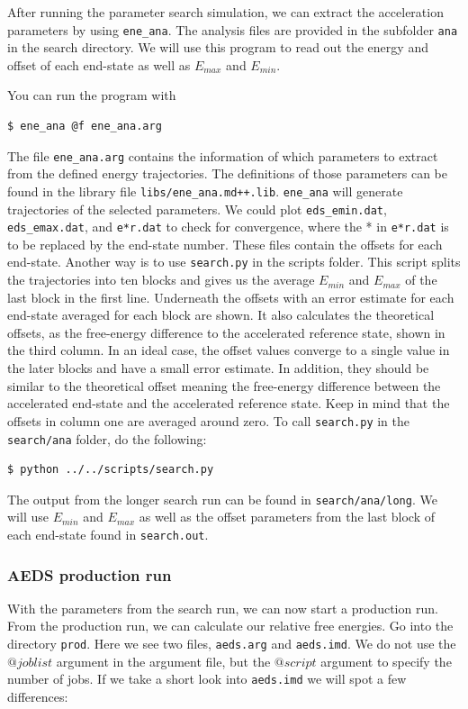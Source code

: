 After running the parameter search simulation, we can extract the acceleration parameters by using \texttt{ene\_ana}. The analysis files are provided in the subfolder \texttt{ana} in the search directory. 
We will use this program to read out the energy and offset of each end-state as well as $E_{max}$ and $E_{min}$. 

You can run the program with 
\begin{lstlisting}
$ ene_ana @f ene_ana.arg
\end{lstlisting}

The file \texttt{ene\_ana.arg} contains the information of which parameters to extract from the defined energy trajectories. The definitions of those parameters can be found in the library file \texttt{libs/ene\_ana.md++.lib}. \texttt{ene\_ana} will generate trajectories of the selected parameters. We could plot \texttt{eds\_emin.dat}, \texttt{eds\_emax.dat}, and \texttt{e*r.dat} to check for convergence, where the * in \texttt{e*r.dat} is to be replaced by the end-state number. These files contain the offsets for each end-state. Another way is to use \texttt{search.py} in the scripts folder. This script splits the trajectories into ten blocks and gives us the average $E_{min}$ and $E_{max}$ of the last block in the first line. Underneath the offsets with an error estimate for each end-state averaged for each block are shown. It also calculates the theoretical offsets, as the free-energy difference to the accelerated reference state, shown in the third column. In an ideal case, the offset values converge to a single value in the later blocks and have a small error estimate. In addition, they should be similar to the theoretical offset meaning the free-energy difference between the accelerated end-state and the accelerated reference state. Keep in mind that the offsets in column one are averaged around zero.
To call \texttt{search.py} in the \texttt{search/ana} folder, do the following:

\begin{lstlisting}
$ python ../../scripts/search.py
\end{lstlisting}

The output from the longer search run can be found in \texttt{search/ana/long}.
We will use $E_{min}$ and $E_{max}$ as well as the offset parameters from the last block of each end-state found in \texttt{search.out}.

\subsubsection{AEDS production run}
With the parameters from the search run, we can now start a production run. From the production run, we can calculate our relative free energies. Go into the directory \texttt{prod}. Here we see two files, \texttt{aeds.arg} and \texttt{aeds.imd}. We do not use the $@joblist$ argument in the argument file, but the $@script$ argument to specify the number of jobs. If we take a short look into \texttt{aeds.imd} we will spot a few differences:

